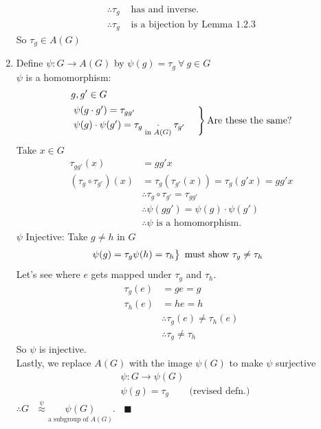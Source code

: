\begin{theorem}
\begin{enumerate}
\begin{align}
    \therefore \tau_g &\text{ has and inverse.} \nonumber \\
    \therefore \tau_g &\text{ is a bijection by Lemma 1.2.3} \nonumber
\end{align}
So $\tau_g \in A(G)$
\item Define $\psi:G\rightarrow A(G)$ by $\psi(g)=\tau_g \ \forall \ g\in G$ \\
$\psi$ is a homomorphism: 
\begin{align}
    &g,g' \in G \nonumber \\
    &\begin{rcases}
    \psi(g\cdot g')=\tau_{gg'}  \\
    \psi(g)\cdot \psi(g')=\tau_{g}\underset{\text{in }A(G)}{\cdot} \tau_{g'} \ \ \ \ 
    \end{rcases}\text{Are these the same?} \nonumber
\end{align}
Take $x\in G$
\begin{align}
    \tau_{gg'}(x)&=gg'x \nonumber \\
    (\tau_g\circ \tau_{g'})(x)&= \tau_g(\tau_{g'}(x))=\tau_g(g'x)=gg'x \nonumber \\
    &\therefore \tau_g\circ\tau_{g'}=\tau_{gg'} \nonumber \\
    &\therefore \psi(gg')=\psi(g)\cdot \psi(g') \nonumber \\
    &\therefore \psi \text{ is a homomorphism.} \nonumber
\end{align}
$\psi$ Injective: Take $g\neq h $ in $G$
\begin{align}
    &\begin{rcases}
    \psi(g)=\tau_g 
    \psi(h)=\tau_h
    \end{rcases} \text{ must show }\tau_g\neq \tau_h \nonumber
\end{align}
Let's see where $e$ gets mapped under $\tau_g$ and $\tau_h$.
\begin{align}
    \tau_g(e)&=ge=g \nonumber \\
    \tau_h(e)&=he=h \nonumber \\
    &\therefore \tau_g(e)\neq \tau_h(e) \nonumber \\
    &\therefore \tau_g \neq \tau_h \nonumber
\end{align}
So $\psi$ is injective. \\
Lastly, we replace $A(G)$ with the image $\psi(G)$ to make $\psi$ surjective
\begin{align}
    &\psi: G\rightarrow \psi(G) \nonumber \\
    &\psi(g)=\tau_g \ \ \ \ \ \ \ \ \text{ (revised defn.)} \nonumber
\end{align}
$\therefore G \ \ \ \overset{\psi}{\approx} \underset{\text{a subgroup of }A(G)}{\psi(G)}. \ \ \ \ \blacksquare$
\end{enumerate}

\end{theorem}

